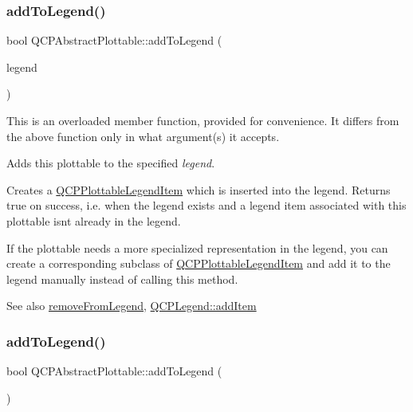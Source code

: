 \subsubsection{\texorpdfstring{add\+To\+Legend()}{addToLegend()}\hspace{0.1cm}{\footnotesize\ttfamily [1/2]}}
{\footnotesize\ttfamily bool Q\+C\+P\+Abstract\+Plottable\+::add\+To\+Legend (\begin{DoxyParamCaption}\item[{\mbox{\hyperlink{class_q_c_p_legend}{Q\+C\+P\+Legend}} $\ast$}]{legend }\end{DoxyParamCaption})}

This is an overloaded member function, provided for convenience. It differs from the above function only in what argument(s) it accepts.

Adds this plottable to the specified {\itshape legend}.

Creates a \mbox{\hyperlink{class_q_c_p_plottable_legend_item}{Q\+C\+P\+Plottable\+Legend\+Item}} which is inserted into the legend. Returns true on success, i.\+e. when the legend exists and a legend item associated with this plottable isn\textquotesingle{}t already in the legend.

If the plottable needs a more specialized representation in the legend, you can create a corresponding subclass of \mbox{\hyperlink{class_q_c_p_plottable_legend_item}{Q\+C\+P\+Plottable\+Legend\+Item}} and add it to the legend manually instead of calling this method.

\begin{DoxySeeAlso}{See also}
\mbox{\hyperlink{class_q_c_p_abstract_plottable_a3cc235007e2343a65ad4f463767e0e20}{remove\+From\+Legend}}, \mbox{\hyperlink{class_q_c_p_legend_a3ab274de52d2951faea45a6d975e6b3f}{Q\+C\+P\+Legend\+::add\+Item}} 
\end{DoxySeeAlso}
\mbox{\label{class_q_c_p_abstract_plottable_a70f8cabfd808f7d5204b9f18c45c13f5}} 
\subsubsection{\texorpdfstring{add\+To\+Legend()}{addToLegend()}\hspace{0.1cm}{\footnotesize\ttfamily [2/2]}}
{\footnotesize\ttfamily bool Q\+C\+P\+Abstract\+Plottable\+::add\+To\+Legend (\begin{DoxyParamCaption}{ }\end{DoxyParamCaption})}


